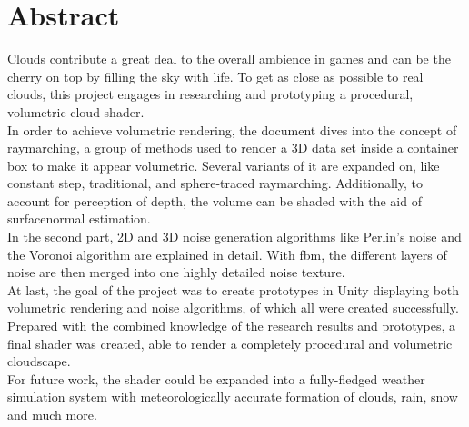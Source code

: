 \section*{Abstract}
Clouds contribute a great deal to the overall ambience in games and can be the cherry on top by filling the sky with life.
To get as close as possible to real clouds, this project engages in researching and prototyping a \gls{procedural}, volumetric cloud shader.
\\
In order to achieve \gls{volumetric} rendering, the document dives into the concept of \gls{raymarching}, a group of methods used to render a 3D data set inside a container box to make it appear volumetric.
Several variants of it are expanded on, like constant step, traditional, and sphere-traced \gls{raymarching}. Additionally, to account for perception of depth, the volume can be shaded with the aid of \gls{surfacenormal} estimation.
\\
In the second part, 2D and 3D \gls{noise} generation algorithms like Perlin's noise and the Voronoi algorithm are explained in detail. With \gls{fbm}, the different layers of noise are then merged into one highly detailed noise texture.
\\
At last, the goal of the project was to create prototypes in Unity displaying both volumetric rendering and noise algorithms, of which all were created successfully.
Prepared with the combined knowledge of the research results and prototypes, a final shader was created, able to render a completely \gls{procedural} and volumetric cloudscape.
\\
For future work, the shader could be expanded into a fully-fledged weather simulation system with meteorologically accurate formation of clouds, rain, snow and much more.